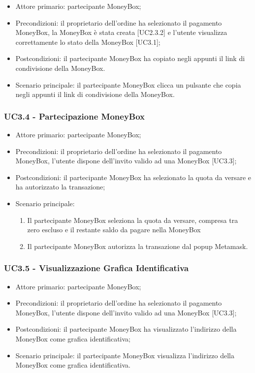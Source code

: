 \begin{itemize}
    \item Attore primario: partecipante MoneyBox\glo{};
    \item Precondizioni: il proprietario dell'ordine ha selezionato il pagamento MoneyBox\glo [UC2.2.2], la MoneyBox\glo{} è stata creata [UC2.3.2] e l'utente visualizza correttamente lo stato della MoneyBox\glo{} [UC3.1];
    \item Postcondizioni: il partecipante MoneyBox\glo{} ha copiato negli appunti il link di condivisione della MoneyBox\glo{}.
    \item Scenario principale: il partecipante MoneyBox\glo{} clicca un pulsante che copia negli appunti il link di condivisione della MoneyBox\glo{}.
\end{itemize}

\subsubsection{UC3.4 - Partecipazione MoneyBox}

\begin{itemize}
    \item Attore primario: partecipante MoneyBox\glo{};
    \item Precondizioni: il proprietario dell'ordine ha selezionato il pagamento MoneyBox\glo [UC2.2.2], 
            l'utente dispone dell'invito valido ad una MoneyBox\glo{} [UC3.3];
    \item Postcondizioni: il partecipante MoneyBox\glo{} ha selezionato la quota da versare e ha autorizzato la transazione;
    \item Scenario principale:
          \begin{enumerate}
              \item Il partecipante MoneyBox\glo{} seleziona la quota da versare, compresa tra zero escluso e il restante saldo da pagare nella MoneyBox\glo{}
              \item Il partecipante MoneyBox\glo{} autorizza la transazione dal popup Metamask\glo{}.
          \end{enumerate}
\end{itemize}

\subsubsection{UC3.5 - Visualizzazione Grafica Identificativa}

\begin{itemize}
    \item Attore primario: partecipante MoneyBox\glo{};
    \item Precondizioni: il proprietario dell'ordine ha selezionato il pagamento MoneyBox\glo [UC2.2.2], 
            l'utente dispone dell'invito valido ad una MoneyBox\glo{} [UC3.3];
    \item Postcondizioni: il partecipante MoneyBox\glo{} ha visualizzato l'indirizzo della MoneyBox\glo{} come grafica identificativa;
    \item Scenario principale: il partecipante MoneyBox\glo{} visualizza l'indirizzo della MoneyBox\glo{} come grafica identificativa.
\end{itemize}

